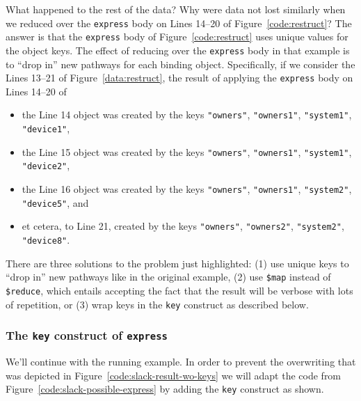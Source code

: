 \documentclass[10pt,letterpaper]{article} %
\newcommand{\stt}[1]{\texttt{#1}} %
\begin{document}
What happened to the rest of the data?
Why were data not lost similarly when we reduced over the \stt{express} body on Lines 14--20 of Figure~\ref{code:restruct}?
The answer is that the \stt{express} body of Figure~\ref{code:restruct} uses unique values for the object keys.
The effect of reducing over the \stt{express} body in that example is to ``drop in'' new pathways for each binding object.
Specifically, if we consider the Lines 13--21 of Figure~\ref{data:restruct}, the result of applying the \stt{express} body on Lines 14--20 of %

\begin{itemize}
\item the Line 14 object was created by the keys \stt{"owners"}, \stt{"owners1"}, \stt{"system1"}, \stt{"device1"},
\item the Line 15 object was created by the keys \stt{"owners"}, \stt{"owners1"}, \stt{"system1"}, \stt{"device2"},
\item the Line 16 object was created by the keys \stt{"owners"}, \stt{"owners1"}, \stt{"system2"}, \stt{"device5"}, and
\item et cetera, to Line 21, created by the keys \stt{"owners"}, \stt{"owners2"}, \stt{"system2"}, \stt{"device8"}.
\end{itemize}

There are three solutions to the problem just highlighted:
(1) use unique keys to ``drop in'' new pathways like in the original example,
(2) use \stt{\$map} instead of \stt{\$reduce}, which entails accepting the fact that the result will be verbose with lots of repetition, or
(3) wrap keys in the \stt{key} construct as described below.

\subsubsection{The \stt{key} construct of \stt{express}}

We'll continue with the running example.
In order to prevent the overwriting that was depicted in Figure~\ref{code:slack-result-wo-keys} we will
adapt the code from Figure~\ref{code:slack-possible-express} by adding the \stt{key} construct as shown.
\end{document}
